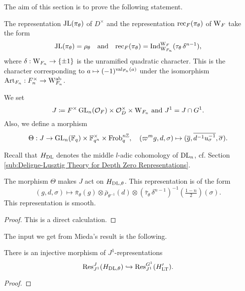 \documentclass[../main.tex]{subfiles}
\begin{document}
The aim of this section is to prove the following statement.
\begin{thm}\label{thm:MainRes1}
  The representation $\mathrm{JL}(\pi_\theta)$ of $D^\times$ and the representation
  $\mathrm{rec}_F(\pi_\theta)$ of $\mathrm W_F$ take the form
  \begin{equation*}
    \mathrm{JL}(\pi_\theta) = \rho_{\theta}
    \quad \text{and} \quad \mathrm{rec}_F(\pi_\theta) = \mathrm{Ind}_{\mathrm W_{F_n}}^{\mathrm W_F} 
    (\tau_\theta \, \delta^{n-1}),
  \end{equation*}
  where $\delta: \mathrm W_{F_n} \to \{\pm 1\}$ is the unramified quadratic
  character. This is the character corresponding to $a \mapsto
  (-1)^{\mathrm{val}_{F_n}(a)}$ under the isomorphism $\mathrm{Art}_{F_n}: F_n^\times \to
  \mathrm W_{F_n}^{\mathrm{ab}}$. 
\end{thm}

We set 
\begin{equation} \label{eq:defJandJ1}
  J \coloneqq F^\times \operatorname{GL}_n(\mathcal{O}_F) \times \mathcal{O}_D^\times \times \mathrm W_{F_n}
  \text{ and } J^1 = J \cap G^1.
\end{equation}
Also, we define a morphism 
\begin{equation*}
  \Theta: J \to \operatorname{GL}_n(\mathbb{F}_q) \times \mathbb{F}_{q^n}^\times \times {\operatorname{Frob}_q^{n\mathbb{Z}}}, \quad
  (\varpi^m g,d,\sigma) \mapsto (\overline g, \overline {d^{-1}u_\sigma^{-1}}, \overline{\sigma}).
\end{equation*}

Recall that $H_{\mathrm{DL}}$ denotes the middle $l$-adic cohomology of 
$\mathrm{DL}_n$, cf. Section \ref{sub:Deligne-Lusztig Theory for Depth Zero Representations}.
\begin{lem}
  The morphism $\Theta$ makes $J$ act on ${H}_{\mathrm{DL},\theta}$. This representation is 
  of the form 
  \begin{equation*}
    (g,d,\sigma) \mapsto \bar \pi_\theta(g) \otimes \bar \rho_{\theta^{-1}}(d)
    \otimes \left(\bar \tau_\theta \, \delta^{n-1}\right)^{-1}(\tfrac{1-n}2)(\sigma).
  \end{equation*}
  This representation is smooth.
\begin{proof}
  This is a direct calculation.
\end{proof}
\end{lem}

The input we get from Mieda's result is the following.
\begin{prop}\label{prop:J1EquivInjMor}
  There is an injective morphism of  $J^1$-representations
  \begin{equation*} 
    \mathrm{Res}_{J^1}^J( H_{\mathrm{DL},\theta} ) \hookrightarrow \mathrm{Res}_{J^1}^{G^1}( H'_{\mathrm{LT}}).
  \end{equation*}
\begin{proof}
\end{proof}
\end{prop}
\end{document}
